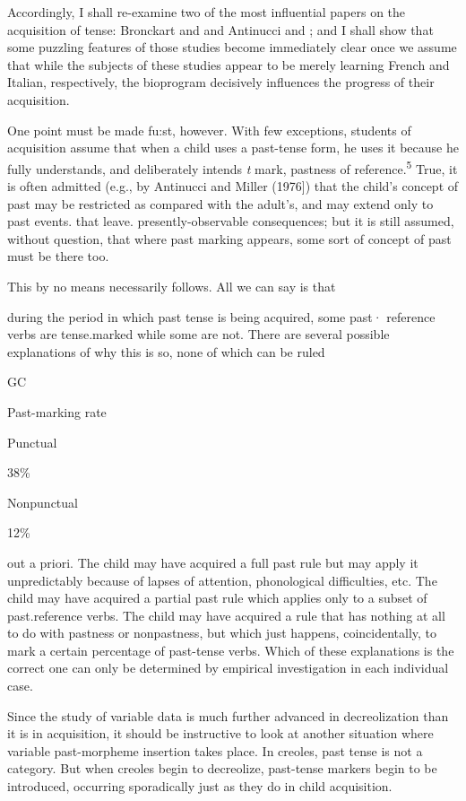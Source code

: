 Accordingly, I shall re-examine two of the most influential papers on the acquisition of tense: Bronckart and \citet{Sinclair1973} and Antinucci and \citet{Miller1976}; and I shall show that some puzzling features of those studies become immediately clear once we assume that while the subjects of these studies appear to be merely learning French and Italian, respectively, the bioprogram decisively influences the progress of their acquisition.

One point must be made fu:st, however. With few exceptions, students of acquisition assume that when a child uses a past-tense form, he uses it because he fully understands, and deliberately intends \textit{t} mark, pastness of reference.\textsuperscript{5} True, it is often admitted (e.g., by Antinucci and Miller (1976]) that the child's concept of past may be restricted as compared with the adult's, and may extend only to past events. that leave. presently-observable consequences; but it is still assumed, without question, that where past marking appears, some sort of concept of past must be there too.

This by no means necessarily follows. All we can say is that

during the period in which past tense is being acquired, some past· reference verbs are tense.marked while some are not. There are several possible explanations of why this is so, none of which can be ruled

GC

Past-marking rate

Punctual

38\%

Nonpunctual

12\%

out a priori. The child may have acquired a full past rule but may
apply it unpredictably because of lapses of attention, phonological difficulties, etc. The child may have acquired a partial past rule which applies only to a subset of past.reference verbs. The child may have acquired a rule that has nothing at all to do with pastness or non\-pastness, but which just happens, coincidentally, to mark a certain percentage of past-tense verbs. Which of these explanations is the correct one can only be determined by empirical investigation in each individual case.

Since the study of variable data is much further advanced in decreolization than it is in acquisition, it should be instructive to look at another situation where variable past-morpheme insertion takes place. In creoles, past tense is not a category. But when creoles begin to decreolize, past-tense markers begin to be introduced, occurring sporadically just as they do in child acquisition.

